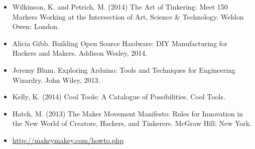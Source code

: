 \documentclass{../fal_assignment}
\begin{document}
\begin{itemize}
    \item Wilkinson, K. and Petrich, M. (2014) The Art of Tinkering: Meet 150 Markers Working at the Intersection of Art, Science \& Technology. Weldon Owen: London.
    \item Alicia Gibb. Building Open Source Hardware: DIY Manufacturing for Hackers and Makers. Addison Wesley, 2014. 
    \item Jeremy Blum. Exploring Arduino: Tools and Techniques for Engineering Wizardry. John Wiley, 2013. 
    \item Kelly, K. (2014) Cool Tools: A Catalogue of Possibilities. Cool Tools.
    \item Hatch, M. (2013) The Maker Movement Manifesto: Rules for Innovation in the New World of Creators, Hackers, and Tinkerers. McGraw Hill: New York.
    \item \url{http://makeymakey.com/howto.php}
\end{itemize}

\end{document}
